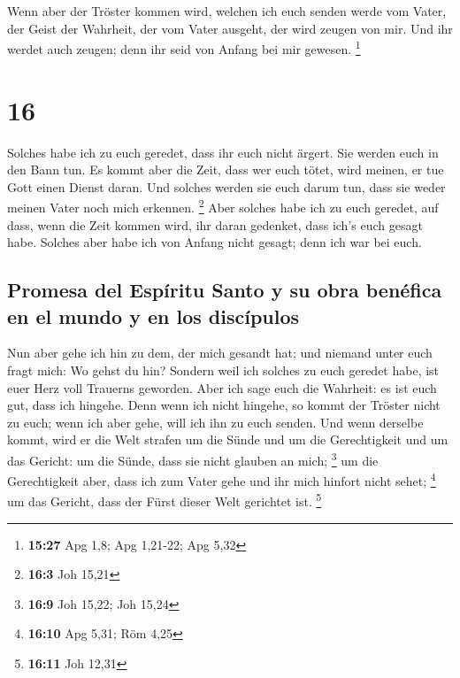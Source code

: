  Wenn aber der Tröster kommen wird, welchen ich euch
senden werde vom Vater, der Geist der Wahrheit, der vom Vater ausgeht,
der wird zeugen von mir.  Und ihr werdet auch zeugen;
denn ihr seid von Anfang bei mir gewesen. \footnote{\textbf{15:27} Apg
  1,8; Apg 1,21-22; Apg 5,32}

\hypertarget{section-15}{%
\section{16}\label{section-15}}

 Solches habe ich zu euch geredet, dass ihr euch nicht
ärgert.  Sie werden euch in den Bann tun. Es kommt aber
die Zeit, dass wer euch tötet, wird meinen, er tue Gott einen Dienst
daran.  Und solches werden sie euch darum tun, dass sie
weder meinen Vater noch mich erkennen. \footnote{\textbf{16:3} Joh 15,21}
 Aber solches habe ich zu euch geredet, auf dass, wenn die
Zeit kommen wird, ihr daran gedenket, dass ich's euch gesagt habe.
Solches aber habe ich von Anfang nicht gesagt; denn ich war bei euch.

\hypertarget{promesa-del-espuxedritu-santo-y-su-obra-benuxe9fica-en-el-mundo-y-en-los-discuxedpulos}{%
\subsection{Promesa del Espíritu Santo y su obra benéfica en el mundo y
en los
discípulos}\label{promesa-del-espuxedritu-santo-y-su-obra-benuxe9fica-en-el-mundo-y-en-los-discuxedpulos}}

 Nun aber gehe ich hin zu dem, der mich gesandt hat; und
niemand unter euch fragt mich: Wo gehst du hin?  Sondern
weil ich solches zu euch geredet habe, ist euer Herz voll Trauerns
geworden.  Aber ich sage euch die Wahrheit: es ist euch
gut, dass ich hingehe. Denn wenn ich nicht hingehe, so kommt der Tröster
nicht zu euch; wenn ich aber gehe, will ich ihn zu euch senden.
 Und wenn derselbe kommt, wird er die Welt strafen um die
Sünde und um die Gerechtigkeit und um das Gericht:  um die
Sünde, dass sie nicht glauben an mich; \footnote{\textbf{16:9} Joh
  15,22; Joh 15,24}  um die Gerechtigkeit aber, dass ich
zum Vater gehe und ihr mich hinfort nicht sehet; \footnote{\textbf{16:10}
  Apg 5,31; Röm 4,25}  um das Gericht, dass der Fürst
dieser Welt gerichtet ist. \footnote{\textbf{16:11} Joh 12,31}

